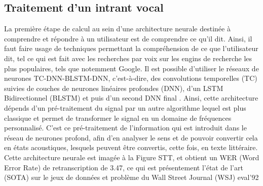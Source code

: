\subsection{Traitement d'un intrant vocal}
La première étape de calcul au sein d’une architecture neurale destinée à comprendre et répondre à un utilisateur est de comprendre ce qu’il dit. Ainsi, il faut faire usage de techniques permettant la compréhension de ce que l’utilisateur dit, tel ce qui est fait avec les recherches par voix sur les engins de recherche les plus populaires, tels que notemment Google. Il est possible d’utiliser le réseaux de neurones TC-DNN-BLSTM-DNN, c’est-à-dire, des convolutions temporelles (TC) suivies de couches de neurones linéaires profondes (DNN), d’un LSTM Bidirectionnel (BLSTM) et puis d’un second DNN final \cite{acousticModeling}. Ainsi, cette architecture dépends d’un pré-traitement du signal par un autre algorithme lequel est plus classique et permet de transformer le signal en un domaine de fréquences personnalisé. C’est ce pré-traitement de l’information qui est introduit dans le réseau de neurones profond, afin d’en analyser le sens et de pouvoir convertir cela en états acoustiques, lesquels peuvent être convertis, cette fois, en texte littéraire. Cette architecture neurale est imagée à la Figure STT, et obtient un WER (Word Error Rate) de retranscription de 3.47, ce qui est présentement l’état de l’art (SOTA) sur le jeux de données et problème du Wall Street Journal (WSJ) eval’92 %

